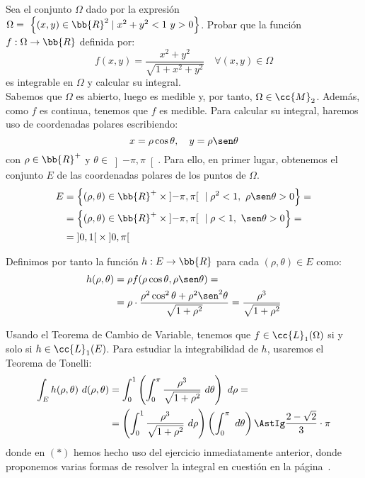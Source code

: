 \begin{ejercicio}
    Sea el conjunto $\Omega$ dado por la expresión $\Omega=~\left\{(x,y)\in \bb{R}^2 \mid x^2+y^2<1~y>0\right\}$. Probar que la función \( f:\Omega\to \bb{R} \) definida por:
    \[ f(x,y) = \dfrac{x^2+y^2}{\sqrt{1+x^2+y^2}} \quad \forall (x,y)\in \Omega \]
    es integrable en \( \Omega \) y calcular su integral.\\

    Sabemos que $\Omega$ es abierto, luego es medible y, por tanto, $\Omega\in \cc{M}_2$. Además, como $f$ es continua, tenemos que $f$ es medible.
    Para calcular su integral, haremos uso de coordenadas polares escribiendo:
    \begin{equation*}
        x = \rho\cos\theta, \quad y = \rho\sen\theta
    \end{equation*}
    con $\rho\in \bb{R}^+$ y $\theta\in \left]-\pi, \pi\right[$. Para ello, en primer lugar, obtenemos el conjunto $E$ de las coordenadas polares de los puntos de $\Omega$.
    \begin{align*}
        E &= \left\{ (\rho, \theta) \in \bb{R}^+\times \left]-\pi, \pi\right[ ~\mid \rho^2 < 1,~\rho\sen\theta > 0 \right\} =\\
        &= \left\{ (\rho, \theta) \in \bb{R}^+\times \left]-\pi, \pi\right[ ~\mid \rho < 1,~\sen\theta > 0 \right\} =\\
        &= \left]0, 1\right[\times \left]0, \pi\right[
    \end{align*}

    Definimos por tanto la función $h: E \to \bb{R}$ para cada $(\rho, \theta) \in E$ como:
    \begin{align*}
        h(\rho, \theta) &= \rho f(\rho\cos\theta, \rho\sen\theta)=\\
        &= \rho\cdot \dfrac{\rho^2\cos^2\theta+\rho^2\sen^2\theta}{\sqrt{1+\rho^2}}
        = \dfrac{\rho^3}{\sqrt{1+\rho^2}}
    \end{align*}

    Usando el Teorema de Cambio de Variable, tenemos que $f\in \cc{L}_1(\Omega)$ si y solo si $h\in \cc{L}_1(E)$. Para estudiar la integrabilidad de $h$, usaremos el Teorema de Tonelli:
    \begin{align*}
        \int_E h(\rho, \theta)~d(\rho, \theta) &=
        \int_0^1 \left( \int_0^{\pi} \dfrac{\rho^3}{\sqrt{1+\rho^2}}~d\theta \right)~d\rho =\\
        &= \left( \int_0^1 \dfrac{\rho^3}{\sqrt{1+\rho^2}}~d\rho \right) \left( \int_0^{\pi}~d\theta \right)
        \AstIg \dfrac{2-\sqrt{2}}{3} \cdot \pi
    \end{align*}
    donde en $(\ast)$ hemos hecho uso del ejercicio inmediatamente anterior, donde proponemos varias formas de resolver la integral en cuestión en la página~\pageref{desc:optInt}.
\end{ejercicio}


